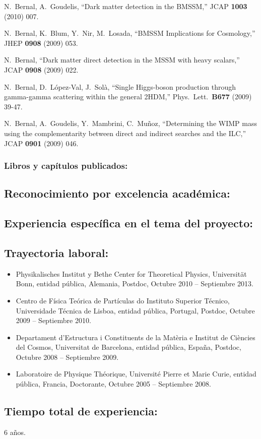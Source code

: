   N.~Bernal, A.~Goudelis,
  ``Dark matter detection in the BMSSM,''
  JCAP {\bf 1003 } (2010)  007.

  N.~Bernal, K.~Blum, Y.~Nir, M.~Losada,
  ``BMSSM Implications for Cosmology,''
  JHEP {\bf 0908 } (2009)  053.

  N.~Bernal,
  ``Dark matter direct detection in the MSSM with heavy scalars,''
  JCAP {\bf 0908 } (2009)  022.

  N.~Bernal, D.~López-Val, J.~Solà,
  ``Single Higgs-boson production through gamma-gamma scattering within the general 2HDM,''
  Phys.\ Lett.\  {\bf B677 } (2009)  39-47.

  N.~Bernal, A.~Goudelis, Y.~Mambrini, C.~Muñoz,
  ``Determining the WIMP mass using the complementarity between direct and indirect searches and the ILC,''
  JCAP {\bf 0901 } (2009)  046.
\subsubsection{Libros y capítulos publicados:}
\subsection{Reconocimiento por excelencia académica:}
\subsection{Experiencia específica en el tema del proyecto:}
\subsection{Trayectoria laboral:}
\begin{itemize}
\item Physikalisches Institut y Bethe Center for Theoretical Physics, Universität Bonn, entidad pública, Alemania, Postdoc, Octubre 2010 -- Septiembre 2013.
\item Centro de Física Teórica de Partículas do Instituto Superior Técnico, Universidade Técnica de Lisboa, entidad pública, Portugal, Postdoc, Octubre 2009 -- Septiembre 2010.
\item Departament d'Estructura i Constituents de la Matèria e Institut de Ciències del Cosmos, Universitat de Barcelona, entidad pública, España, Postdoc, Octubre 2008 -- Septiembre 2009.
\item Laboratoire de Physique Théorique, Université Pierre et Marie Curie, entidad pública, Francia, Doctorante, Octubre 2005 -- Septiembre 2008.
\end{itemize}
\subsection{Tiempo total de experiencia:}
6 años.


